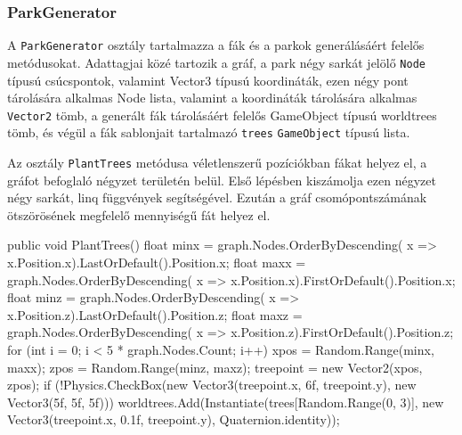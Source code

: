 \subsubsection{ParkGenerator}

A \texttt{ParkGenerator} osztály tartalmazza a fák és a parkok generálásáért felelős metódusokat. Adattagjai közé tartozik a gráf, a park négy sarkát jelölő \texttt{Node} típusú csúcspontok, valamint Vector3 típusú koordináták, ezen négy pont tárolására alkalmas Node lista, valamint a koordináták tárolására alkalmas \texttt{Vector2} tömb, a generált fák tárolásáért felelős GameObject típusú worldtrees tömb, és végül a fák sablonjait tartalmazó \texttt{trees} \texttt{GameObject} típusú lista.

Az osztály \texttt{PlantTrees} metódusa  véletlenszerű pozíciókban fákat helyez el, a gráfot befoglaló négyzet területén belül. Első lépésben kiszámolja ezen négyzet négy sarkát, linq függvények segítségével. Ezután a gráf csomópontszámának ötszörösének megfelelő mennyiségű fát helyez el.
\begin{cpp}
public void PlantTrees()
    {
        float minx = graph.Nodes.OrderByDescending(
        x => x.Position.x).LastOrDefault().Position.x;
        float maxx = graph.Nodes.OrderByDescending(
        x => x.Position.x).FirstOrDefault().Position.x;
        float minz = graph.Nodes.OrderByDescending(
        x => x.Position.z).LastOrDefault().Position.z;
        float maxz = graph.Nodes.OrderByDescending(
        x => x.Position.z).FirstOrDefault().Position.z;
        for (int i = 0; i < 5 * graph.Nodes.Count; i++)
        {
            xpos = Random.Range(minx, maxx);
            zpos = Random.Range(minz, maxz);
            treepoint = new Vector2(xpos, zpos);
            if (!Physics.CheckBox(new Vector3(treepoint.x, 6f, 
            treepoint.y), new Vector3(5f, 5f, 5f)))
            {
                worldtrees.Add(Instantiate(trees[Random.Range(0, 3)], 
                new Vector3(treepoint.x, 0.1f, treepoint.y), 
                Quaternion.identity));
            }
        }
    }
\end{cpp}

